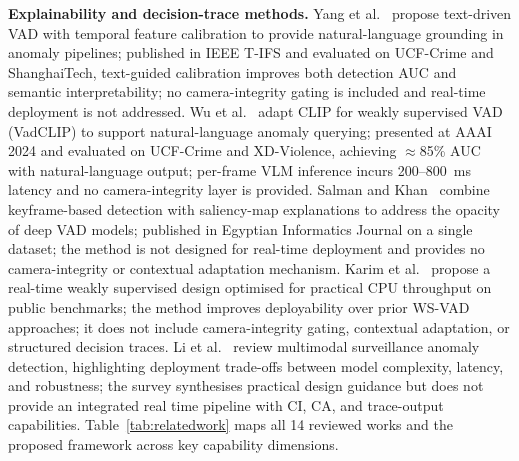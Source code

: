 \documentclass[sensors,article,submit,pdftex,moreauthors]{Definitions/mdpi}
\begin{document}
\textbf{Explainability and decision-trace methods.}
Yang et al.~\cite{yang2024textvad} propose text-driven VAD with temporal feature calibration to provide natural-language grounding in anomaly pipelines; published in IEEE T-IFS and evaluated on UCF-Crime and ShanghaiTech, text-guided calibration improves both detection AUC and semantic interpretability; no camera-integrity gating is included and real-time deployment is not addressed.
Wu et al.~\cite{wu2024vadclip} adapt CLIP for weakly supervised VAD (VadCLIP) to support natural-language anomaly querying; presented at AAAI 2024 and evaluated on UCF-Crime and XD-Violence, achieving $\approx$85\% AUC with natural-language output; per-frame VLM inference incurs 200--800~ms latency and no camera-integrity layer is provided.
Salman and Khan~\cite{salman2025explainable} combine keyframe-based detection with saliency-map explanations to address the opacity of deep VAD models; published in Egyptian Informatics Journal on a single dataset; the method is not designed for real-time deployment and provides no camera-integrity or contextual adaptation mechanism. Karim et al.~\cite{karim2024real} propose a real-time weakly supervised design optimised for practical CPU throughput on public benchmarks; the method improves deployability over prior WS-VAD approaches; it does not include camera-integrity gating, contextual adaptation, or structured decision traces. Li et al.~\cite{li2024multimodal} review multimodal surveillance anomaly detection, highlighting deployment trade-offs between model complexity, latency, and robustness; the survey synthesises practical design guidance but does not provide an integrated real time pipeline with CI, CA, and trace-output capabilities. Table~\ref{tab:relatedwork} maps all 14 reviewed works and the proposed framework across key capability dimensions.
 
\end{document}
